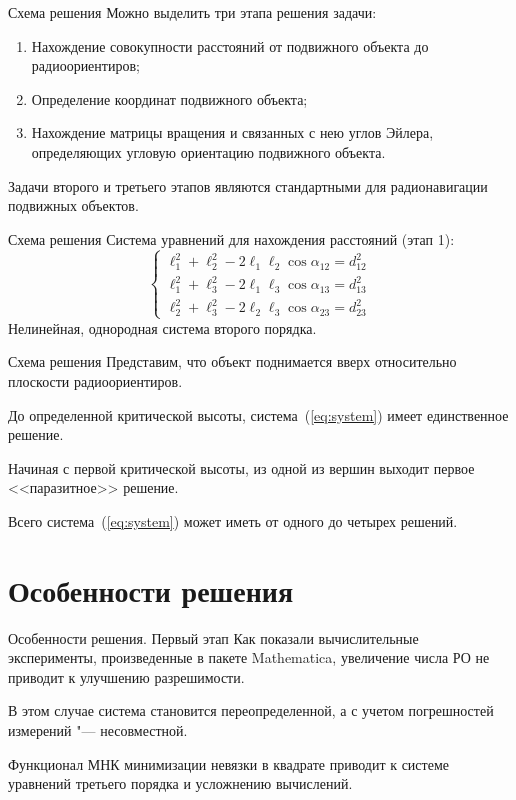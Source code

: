 \documentclass[russian,hyperref={unicode}]{beamer}
\begin{document}
  \begin{frame}{Схема решения}
    Можно выделить три этапа решения задачи:
    \begin{enumerate}
        \item Нахождение совокупности расстояний от подвижного объекта до радиоориентиров;
        \item Определение координат подвижного объекта;
        \item Нахождение матрицы вращения и связанных с нею углов Эйлера, определяющих угловую ориентацию подвижного объекта.
    \end{enumerate}
    Задачи второго и третьего этапов являются стандартными для радионавигации подвижных объектов.
  \end{frame}

  \begin{frame}{Схема решения}
    Система уравнений для нахождения расстояний (этап 1):
    \begin{equation} \label{eq:system}
      \begin{cases}
        \ell_1^2 + \ell_2^2 - 2 \ell_1 \ell_2 \cos\alpha_{12} = d_{12}^2 \\
        \ell_1^2 + \ell_3^2 - 2 \ell_1 \ell_3 \cos\alpha_{13} = d_{13}^2 \\
        \ell_2^2 + \ell_3^2 - 2 \ell_2 \ell_3 \cos\alpha_{23} = d_{23}^2
      \end{cases}
    \end{equation}
    Нелинейная, однородная система второго порядка.
  \end{frame}

  \begin{frame}{Схема решения}
    Представим, что объект поднимается вверх относительно плоскости радиоориентиров.

    До определенной критической высоты, система~(\ref{eq:system}) имеет единственное решение.

    Начиная с первой критической высоты, из одной из вершин выходит первое <<паразитное>>
    решение.

    Всего система~(\ref{eq:system}) может иметь от одного до четырех решений.
  \end{frame}

  \section{Особенности решения}
  \begin{frame}{Особенности решения. Первый этап}
    Как показали вычислительные эксперименты, произведенные в пакете Mathematica,
    увеличение числа РО не приводит к улучшению разрешимости.

    В этом случае система становится переопределенной, а с учетом погрешностей измерений "---
    несовместной.

    Функционал МНК минимизации невязки в квадрате приводит к системе уравнений третьего порядка
    и усложнению вычислений.
  \end{frame}
\end{document}
